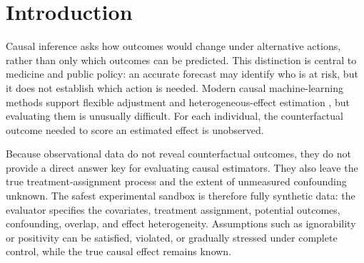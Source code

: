 \documentclass[letterpaper]{article}
\begin{document}
\section{Introduction}

Causal inference asks how outcomes would change under alternative actions,
rather than only which outcomes can be predicted. This distinction is central
to medicine and public policy: an accurate forecast may identify who is at
risk, but it does not establish which action is needed.
Modern causal machine-learning methods support flexible adjustment and
heterogeneous-effect estimation
\cite{chernozhukov2018dml,wager2018causalforest,shalit2017ite,
louizos2017cevae}, but evaluating them is unusually difficult. For each
individual, the counterfactual outcome needed to score an estimated effect is
unobserved.

Because observational data do not reveal counterfactual outcomes, they do not
provide a direct answer key for evaluating causal estimators. They also leave
the true treatment-assignment process and the extent of unmeasured confounding
unknown. The safest experimental sandbox is therefore fully synthetic data: the evaluator specifies the covariates, treatment assignment, potential outcomes, confounding, overlap, and effect heterogeneity. Assumptions such as
ignorability or positivity can be satisfied, violated, or gradually stressed
under complete control, while the true causal effect remains known.
\end{document}
